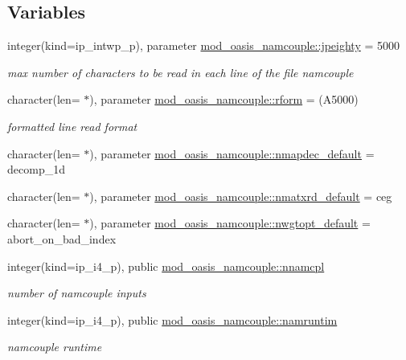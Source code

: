 \subsection*{Variables}
\begin{DoxyCompactItemize}
\item 
integer(kind=ip\+\_\+intwp\+\_\+p), parameter \hyperlink{namespacemod__oasis__namcouple_a4fb10ad6e864dcbe34c4a8b02204a523}{mod\+\_\+oasis\+\_\+namcouple\+::jpeighty} = 5000
\begin{DoxyCompactList}\small\item\em max number of characters to be read in each line of the file namcouple \end{DoxyCompactList}\item 
character(len= $\ast$), parameter \hyperlink{namespacemod__oasis__namcouple_a32ce50ab82412ce502420b56a4e47d71}{mod\+\_\+oasis\+\_\+namcouple\+::rform} = \textquotesingle{}(A5000)\textquotesingle{}
\begin{DoxyCompactList}\small\item\em formatted line read format \end{DoxyCompactList}\item 
character(len= $\ast$), parameter \hyperlink{namespacemod__oasis__namcouple_a88ddb8ab5304da53ddf232e72b31cd45}{mod\+\_\+oasis\+\_\+namcouple\+::nmapdec\+\_\+default} = \textquotesingle{}decomp\+\_\+1d\textquotesingle{}
\item 
character(len= $\ast$), parameter \hyperlink{namespacemod__oasis__namcouple_a81f8b2668d8970564e85db2ac2465866}{mod\+\_\+oasis\+\_\+namcouple\+::nmatxrd\+\_\+default} = \textquotesingle{}ceg\textquotesingle{}
\item 
character(len= $\ast$), parameter \hyperlink{namespacemod__oasis__namcouple_a3b0f98a2f8fc07f944af7fc650ea3eff}{mod\+\_\+oasis\+\_\+namcouple\+::nwgtopt\+\_\+default} = \textquotesingle{}abort\+\_\+on\+\_\+bad\+\_\+index\textquotesingle{}
\item 
integer(kind=ip\+\_\+i4\+\_\+p), public \hyperlink{namespacemod__oasis__namcouple_a5ca7cd6a5b9f939b68492200aa92bab4}{mod\+\_\+oasis\+\_\+namcouple\+::nnamcpl}
\begin{DoxyCompactList}\small\item\em number of namcouple inputs \end{DoxyCompactList}\item 
integer(kind=ip\+\_\+i4\+\_\+p), public \hyperlink{namespacemod__oasis__namcouple_a14505eaa91b2c8ba308c63ff78652206}{mod\+\_\+oasis\+\_\+namcouple\+::namruntim}
\begin{DoxyCompactList}\small\item\em namcouple runtime \end{DoxyCompactList}\item 

\end{DoxyCompactItemize}
